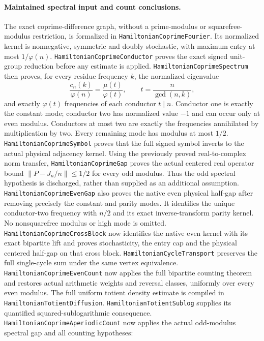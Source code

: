 \paragraph{Maintained spectral input and count conclusions.}
The exact coprime-difference graph, without a prime-modulus or
squarefree-modulus restriction, is formalized in
\texttt{HamiltonianCoprimeFourier}.
Its normalized kernel is nonnegative, symmetric and doubly
stochastic, with maximum entry at most \(1/\varphi(n)\).
\texttt{HamiltonianCoprimeConductor} proves the exact signed
unit-group reduction before any estimate is applied.
\texttt{HamiltonianCoprimeSpectrum} then proves, for every
residue frequency \(k\), the normalized eigenvalue
\[
 \frac{c_n(k)}{\varphi(n)}
    =\frac{\mu(t)}{\varphi(t)},\qquad
 t=\frac n{\gcd(n,k)},
\]
and exactly \(\varphi(t)\) frequencies of each conductor
\(t\mid n\). Conductor one is exactly the constant mode;
conductor two has normalized value \(-1\) and can occur only
at even modulus. Conductors at most two are exactly the
frequencies annihilated by multiplication by two.
Every remaining mode has modulus at most \(1/2\).
\texttt{HamiltonianCoprimeSymbol} proves that the full signed
symbol inverts to the actual physical adjacency kernel.
Using the previously proved real-to-complex norm transfer,
\texttt{HamiltonianCoprimeGap} proves the actual centered
real operator bound \(\|P-J_n/n\|\leq1/2\) for every odd
modulus. Thus the odd spectral hypothesis is discharged,
rather than supplied as an additional assumption.
\texttt{HamiltonianCoprimeEvenGap} also proves the native even
physical half-gap after removing precisely the constant and
parity modes. It identifies the unique conductor-two frequency
with \(n/2\) and its exact inverse-transform parity kernel.
No nonsquarefree modulus or high mode is omitted.
\texttt{HamiltonianCoprimeCrossBlock} now identifies the native
even kernel with its exact bipartite lift and proves stochasticity,
the entry cap and the physical centered half-gap on that cross block.
\texttt{HamiltonianCycleTransport} preserves the full single-cycle
sum under the same vertex equivalence.
\texttt{HamiltonianCoprimeEvenCount} now applies the full
bipartite counting theorem and restores actual arithmetic
weights and reversal classes, uniformly over every even modulus.
The full uniform totient density estimate is compiled in
\texttt{HamiltonianTotientDiffusion}.
\texttt{HamiltonianTotientSublog} supplies its quantified
squared-sublogarithmic consequence.
\texttt{HamiltonianCoprimeAperiodicCount} now applies the
actual odd-modulus spectral gap and all counting hypotheses:
